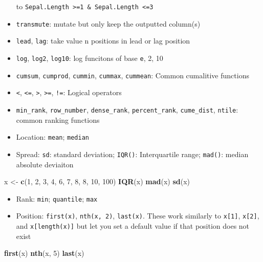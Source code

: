 \documentclass[]{book}
\newenvironment{Shaded}{\begin{snugshade}}{\end{snugshade}}
\newcommand{\DecValTok}[1]{\textcolor[rgb]{0.00,0.00,0.81}{#1}}
\newcommand{\KeywordTok}[1]{\textcolor[rgb]{0.13,0.29,0.53}{\textbf{#1}}}
\newcommand{\NormalTok}[1]{#1}
\newcommand{\StringTok}[1]{\textcolor[rgb]{0.31,0.60,0.02}{#1}}
\providecommand{\tightlist}{%
  \setlength{\itemsep}{0pt}\setlength{\parskip}{0pt}}
\theoremstyle{definition}
\theoremstyle{definition}
\theoremstyle{definition}
\theoremstyle{remark}
\begin{document}
\begin{itemize}
  to
  \texttt{Sepal.Length\ \textgreater{}=1\ \&\ Sepal.Length\ \textless{}=3}
\item
  \texttt{transmute}: mutate but only keep the outputted column(s)
\item
  \texttt{lead}, \texttt{lag}: take value n positions in lead or lag
  position
\item
  \texttt{log}, \texttt{log2}, \texttt{log10}: log funcitons of base
  \texttt{e}, 2, 10
\item
  \texttt{cumsum}, \texttt{cumprod}, \texttt{cummin}, \texttt{cummax},
  \texttt{cummean}: Common cumalitive functions
\item
  \texttt{\textless{}}, \texttt{\textless{}=}, \texttt{\textgreater{}},
  \texttt{\textgreater{}=}, \texttt{!=}: Logical operators
\item
  \texttt{min\_rank}, \texttt{row\_number}, \texttt{dense\_rank},
  \texttt{percent\_rank}, \texttt{cume\_dist}, \texttt{ntile}: common
  ranking functions
\item
  Location: \texttt{mean}; \texttt{median}
\item
  Spread: \texttt{sd}: standard deviation; \texttt{IQR()}: Interquartile
  range; \texttt{mad()}: median absolute deviaiton
\end{itemize}

\begin{Shaded}
\begin{Highlighting}[]
\NormalTok{x <-}\StringTok{ }\KeywordTok{c}\NormalTok{(}\DecValTok{1}\NormalTok{, }\DecValTok{2}\NormalTok{, }\DecValTok{3}\NormalTok{, }\DecValTok{4}\NormalTok{, }\DecValTok{6}\NormalTok{, }\DecValTok{7}\NormalTok{, }\DecValTok{8}\NormalTok{, }\DecValTok{8}\NormalTok{, }\DecValTok{10}\NormalTok{, }\DecValTok{100}\NormalTok{)}
\KeywordTok{IQR}\NormalTok{(x)}
\KeywordTok{mad}\NormalTok{(x)}
\KeywordTok{sd}\NormalTok{(x)}
\end{Highlighting}
\end{Shaded}

\begin{itemize}
\tightlist
\item
  Rank: \texttt{min}; \texttt{quantile}; \texttt{max}
\item
  Position: \texttt{first(x)}, \texttt{nth(x,\ 2)}, \texttt{last(x)}.
  These work similarly to \texttt{x{[}1{]}}, \texttt{x{[}2{]}}, and
  \texttt{x{[}length(x){]}} but let you set a default value if that
  position does not exist
\end{itemize}

\begin{Shaded}
\begin{Highlighting}[]
\KeywordTok{first}\NormalTok{(x)}
\KeywordTok{nth}\NormalTok{(x, }\DecValTok{5}\NormalTok{)}
\KeywordTok{last}\NormalTok{(x)}
\end{Highlighting}
\end{Shaded}
\end{document}
